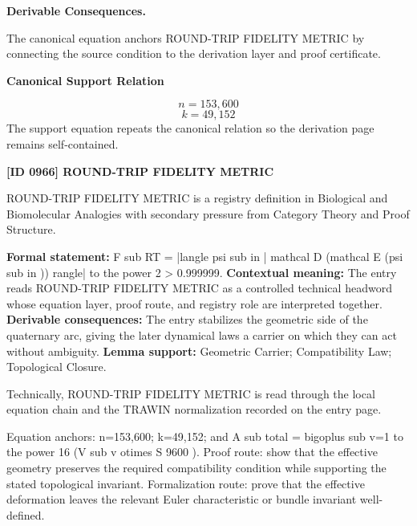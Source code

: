 \par\vspace{0.35em}
\noindent\textbf{Derivable Consequences.}\quad
\begingroup
\footnotesize
\raggedright
The canonical equation anchors ROUND-TRIP FIDELITY METRIC by connecting the source condition to the derivation layer and proof certificate.
\par\endgroup

\noindent\textbf{Canonical Support Relation}\par
\[
n=153,600
\]
\[
k=49,152
\]
\noindent The support equation repeats the canonical relation so the derivation page remains self-contained.\par

\clearpage
\noindent\textbf{[ID 0966] ROUND-TRIP FIDELITY METRIC}\par
\vspace{0.35em}
\begingroup\small
{}
ROUND-TRIP FIDELITY METRIC is a registry definition in Biological and Biomolecular Analogies with secondary pressure from Category Theory and Proof Structure.

\begingroup\footnotesize\setlength{\emergencystretch}{3em}\sloppy
\textbf{Formal statement:} F sub RT = |langle psi sub in | mathcal D (mathcal E (psi sub in )) rangle| to the power 2 > 0.999999. \textbf{Contextual meaning:} The entry reads ROUND-TRIP FIDELITY METRIC as a controlled technical headword whose equation layer, proof route, and registry role are interpreted together. \textbf{Derivable consequences:} The entry stabilizes the geometric side of the quaternary arc, giving the later dynamical laws a carrier on which they can act without ambiguity. \textbf{Lemma support:} Geometric Carrier; Compatibility Law; Topological Closure.\par
\endgroup

Technically, ROUND-TRIP FIDELITY METRIC is read through the local equation chain and the TRAWIN normalization recorded on the entry page.

Equation anchors: n=153,600; k=49,152; and A sub total = bigoplus sub v=1 to the power 16 (V sub v otimes S 9600 ). Proof route: show that the effective geometry preserves the required compatibility condition while supporting the stated topological invariant. Formalization route: prove that the effective deformation leaves the relevant Euler characteristic or bundle invariant well-defined.


